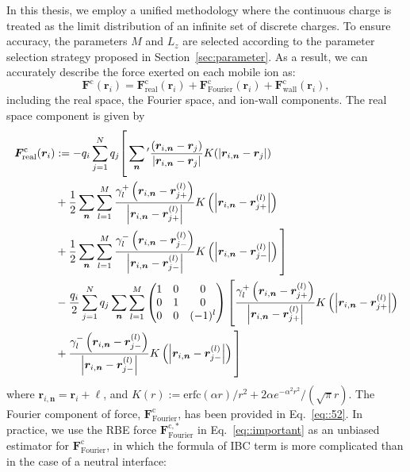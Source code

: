 In this thesis, we employ a unified methodology where the continuous charge is treated as the limit distribution of an infinite set of discrete charges.
To ensure accuracy, the parameters $M$ and $L_z$ are selected according to the parameter selection strategy proposed in Section~\ref{sec:parameter}.
As a result, we can accurately describe the force exerted on each mobile ion as:
\begin{equation}
\bm{F}^{\text{c}}(\bm{r}_i)=\bm{F}^{\text{c}}_{\text{real}}(\bm{r}_i)+\bm{F}^{\text{c}}_{\text{Fourier}}(\bm{r}_i)+\bm{F}^{\text{c}}_{\text{wall}}(\bm{r}_i),
\end{equation}
including the real space, the Fourier space, and ion-wall components. The real space component is given by
\begin{equation}\label{eq::F_real_detail}
\begin{split}
\bm{F}_{\text{real}}^{\te{c}}(\bm{r}_i)
& := -q_i\sum_{j=1}^{N} q_j \Biggg[\sum_{\bm{n}}{}^\prime \frac{\left(\bm{r}_{i,\bm{n}} - \bm{r}_{j}\right)}{\abs{\bm{r}_{i,\bm{n}} - \bm{r}_{j}}} K(\abs{\bm{r}_{i,\bm{n}} - \bm{r}_{j}}) \\
&+ \frac{1}{2} \sum_{\bm{n}} \sum_{l=1}^{M} \frac{\gamma_{l}^+\left(\bm{r}_{i,\bm{n}}-\bm{r}_{j+}^{(l)}\right)}{\left|\bm{r}_{i,\bm{n}}-\bm{r}_{j+}^{(l)}\right|} K\left(\left|\bm{r}_{i,\bm{n}}-\bm{r}_{j+}^{(l)}\right|\right)\\
&+\frac{1}{2}\sum_{\bm{n}}\sum_{l=1}^{M}\frac{\gamma_{l}^-\left(\bm{r}_{i,\bm{n}}-\bm{r}_{j-}^{(l)}\right)}{\left|\bm{r}_{i,\bm{n}}-\bm{r}_{j-}^{(l)}\right|}K\left(\left|\bm{r}_{i,\bm{n}}-\bm{r}_{j-}^{(l)}\right|\right)\Biggg]\\
&-\frac{q_i}{2}\sum_{j=1}^{N}q_j\sum_{\bm{n}}\sum_{l=1}^{M}\begin{pmatrix}
1&0&0\\
0&1&0\\
0&0&(-1)^l
\end{pmatrix}\Biggg[
\frac{\gamma_{l}^+\left(\bm{r}_{i,\bm{n}}-\bm{r}_{j+}^{(l)}\right)}{\left|\bm{r}_{i,\bm{n}}-\bm{r}_{j+}^{(l)}\right|}K\left(\left|\bm{r}_{i,\bm{n}}-\bm{r}_{j+}^{(l)}\right|\right)\\
&+\frac{\gamma_{l}^-\left(\bm{r}_{i,\bm{n}}-\bm{r}_{j-}^{(l)}\right)}{\left|\bm{r}_{i,\bm{n}}-\bm{r}_{j-}^{(l)}\right|}K\left(\left|\bm{r}_{i,\bm{n}}-\bm{r}_{j-}^{(l)}\right|\right)\Biggg]
\end{split}
\end{equation}
where $\bm{r}_{i,\bm{n}}=\bm{r}_{i}+\bm{\ell}$, and $K(r):=\text{erfc}(\alpha r)/r^2+2\alpha e^{-\alpha^2r^2}/(\sqrt{\pi}r)$. The Fourier component of force, $\bm{F}^{\text{c}}_{\text{Fourier}}$, has been provided in Eq.~\eqref{eq::52}. In practice, we use the RBE force $\bm{F}^{\text{c},*}_{\text{Fourier}}$ in Eq.~\eqref{eq::important} as an unbiased estimator for $\bm{F}^{\text{c}}_{\text{Fourier}}$, in which the formula of IBC term is more complicated than  {in} the case of  {a} neutral interface:
